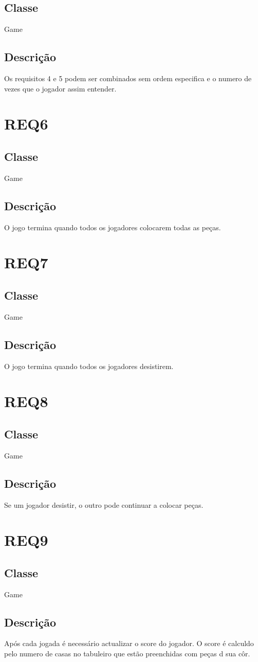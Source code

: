 \subsection{Classe}
Game
\subsection{Descrição}
Os requisitos 4 e 5 podem ser combinados sem ordem especifica e o numero de vezes que o jogador assim entender.
\section{REQ6}
\subsection{Classe}
Game
\subsection{Descrição}
O jogo termina quando todos os jogadores colocarem todas as peças.
\section{REQ7}
\subsection{Classe}
Game
\subsection{Descrição}
O jogo termina quando todos os jogadores desistirem.
\section{REQ8}
\subsection{Classe}
Game
\subsection{Descrição}
Se um jogador desistir, o outro pode continuar a colocar peças.
\section{REQ9}
\subsection{Classe}
Game
\subsection{Descrição}
Após cada jogada é necessário actualizar o score do jogador. O score é calculdo pelo numero de casas no tabuleiro que estão preenchidas com peças d sua côr.
